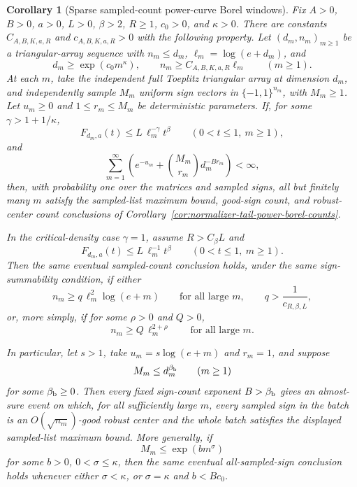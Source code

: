 \documentclass[11pt]{amsart}
\numberwithin{equation}{section}
\newtheorem{corollary}[theorem]{Corollary}
\theoremstyle{definition}
\theoremstyle{remark}
\begin{document}
\begin{corollary}[Sparse sampled-count power-curve Borel windows]
\label{cor:normalizer-tail-power-borel-window-counts}
Fix \(A>0\), \(B>0\), \(a>0\), \(L>0\), \(\beta>2\), \(R\ge1\), \(c_0>0\),
and \(\kappa>0\).  There are constants \(C_{A,B,K,a,R}\) and
\(c_{A,B,K,a,R}>0\) with the following property.  Let
\((d_m,n_m)_{m\ge1}\) be a triangular-array sequence with \(n_m\le d_m\),
\(\ell_m=\log(e+d_m)\), and
\[
  d_m\ge \exp(c_0m^\kappa),\qquad
  n_m\ge C_{A,B,K,a,R}\ell_m
  \qquad(m\ge1).
\]
At each \(m\), take the independent full Toeplitz triangular array at dimension
\(d_m\), and independently sample \(M_m\) uniform sign vectors in
\(\{-1,1\}^{n_m}\), with \(M_m\ge1\).  Let \(u_m\ge0\) and
\(1\le r_m\le M_m\) be deterministic parameters.  If, for some
\(\gamma>1+1/\kappa\),
\[
  F_{d_m,a}(t)\le L\,\ell_m^{-\gamma}t^\beta
  \qquad(0<t\le1,\ m\ge1),
\]
and
\[
  \sum_{m=1}^{\infty}
  \left(e^{-u_m}+\binom{M_m}{r_m}d_m^{-B r_m}\right)<\infty,
\]
then, with probability one over the matrices and sampled signs, all but
finitely many \(m\) satisfy the sampled-list maximum bound, good-sign count, and
robust-center count conclusions of
Corollary~\ref{cor:normalizer-tail-power-borel-counts}.

In the critical-density case \(\gamma=1\), assume \(R>C_\beta L\) and
\[
  F_{d_m,a}(t)\le L\,\ell_m^{-1}t^\beta
  \qquad(0<t\le1,\ m\ge1).
\]
Then the same eventual sampled-count conclusion holds, under the same
sign-summability condition, if either
\[
  n_m\ge q\,\ell_m^2\log(e+m)
  \qquad\text{for all large }m,\qquad
  q>\frac1{c_{R,\beta,L}},
\]
or, more simply, if for some \(\rho>0\) and \(Q>0\),
\[
  n_m\ge Q\,\ell_m^{2+\rho}
  \qquad\text{for all large }m .
\]

In particular, let \(s>1\), take \(u_m=s\log(e+m)\) and \(r_m=1\), and suppose
\[
  M_m\le d_m^{\beta_{\rm b}}
  \qquad(m\ge1)
\]
for some \(\beta_{\rm b}\ge0\).  Then every fixed sign-count exponent
\(B>\beta_{\rm b}\) gives an almost-sure event on which, for all sufficiently
large \(m\), every sampled sign in the batch is an \(O(\sqrt{n_m})\)-good robust
center and the whole batch satisfies the displayed sampled-list maximum bound.
More generally, if
\[
  M_m\le \exp(bm^\sigma)
\]
for some \(b>0\), \(0<\sigma\le\kappa\), then the same eventual all-sampled-sign
conclusion holds whenever either \(\sigma<\kappa\), or \(\sigma=\kappa\) and
\(b<Bc_0\).
\end{corollary}
\end{document}
